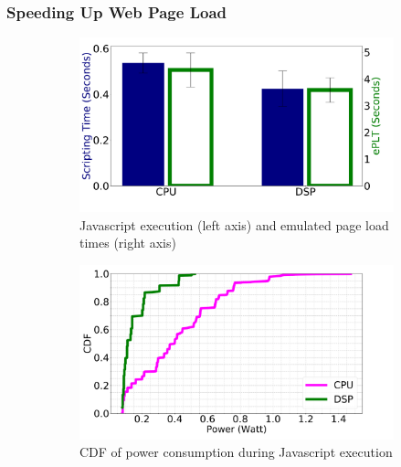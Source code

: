 
\subsubsection{Speeding Up Web Page Load} \label{label:whatif}

\begin{figure}
    \begin{subfigure}[b]{0.33\textwidth}
        \centering
        \includegraphics[width=1\linewidth]{sections/device-work/dsp-plt}
        \caption{Javascript execution (left axis) and emulated page load times (right axis)}
    \end{subfigure}
    \begin{subfigure}[b]{0.33\textwidth}
        \centering
        \includegraphics[width=1\linewidth]{sections/device-work/dsp-power}
        \caption{CDF of power consumption during Javascript execution}
    \end{subfigure}%
    \begin{subfigure}[b]{0.33\textwidth}
        \centering

\end{subfigure}
\end{figure}
